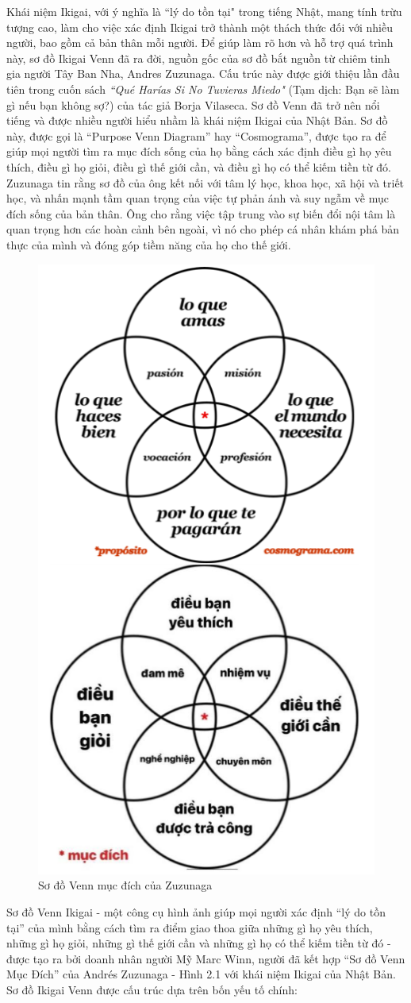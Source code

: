 Khái niệm Ikigai, với ý nghĩa là ``lý do tồn tại" trong tiếng Nhật, mang tính trừu tượng cao, làm cho việc xác định Ikigai trở thành một thách thức đối với nhiều người, bao gồm cả bản thân mỗi người. Để giúp làm rõ hơn và hỗ trợ quá trình này, sơ đồ Ikigai Venn đã ra đời, nguồn gốc của sơ đồ bắt nguồn từ chiêm tinh gia người Tây Ban Nha, Andres Zuzunaga. Cấu trúc này được giới thiệu lần đầu tiên trong cuốn sách \textit{``Qué Harías Si No Tuvieras Miedo"} (Tạm dịch: Bạn sẽ làm gì nếu bạn không sợ?) của tác giả Borja Vilaseca. Sơ đồ Venn đã trở nên nổi tiếng và được nhiều người hiểu nhầm là khái niệm Ikigai của Nhật Bản. Sơ đồ này, được gọi là “Purpose Venn Diagram” hay “Cosmograma”, được tạo ra để giúp mọi người tìm ra mục đích sống của họ bằng cách xác định điều gì họ yêu thích, điều gì họ giỏi, điều gì thế giới cần, và điều gì họ có thể kiếm tiền từ đó. Zuzunaga tin rằng sơ đồ của ông kết nối với tâm lý học, khoa học, xã hội và triết học, và nhấn mạnh tầm quan trọng của việc tự phản ánh và suy ngẫm về mục đích sống của bản thân. Ông cho rằng việc tập trung vào sự biến đổi nội tâm là quan trọng hơn các hoàn cảnh bên ngoài, vì nó cho phép cá nhân khám phá bản thực của mình và đóng góp tiềm năng của họ cho thế giới.

\begin{figure}[H]
    \centering
    \includegraphics[width=0.38\linewidth]{images/chap2/zuzunaga.png}
    \vspace{0.5cm}
    \caption{Sơ đồ Venn mục đích của Zuzunaga}
\end{figure}

Sơ đồ Venn Ikigai - một công cụ hình ảnh giúp mọi người xác định ``lý do tồn tại” của mình bằng cách tìm ra điểm giao thoa giữa những gì họ yêu thích, những gì họ giỏi, những gì thế giới cần và những gì họ có thể kiếm tiền từ đó - được tạo ra bởi doanh nhân người Mỹ Marc Winn, người đã kết hợp “Sơ đồ Venn Mục Đích” của Andrés Zuzunaga - Hình 2.1 với khái niệm Ikigai của Nhật Bản. Sơ đồ Ikigai Venn được cấu trúc dựa trên bốn yếu tố chính:

